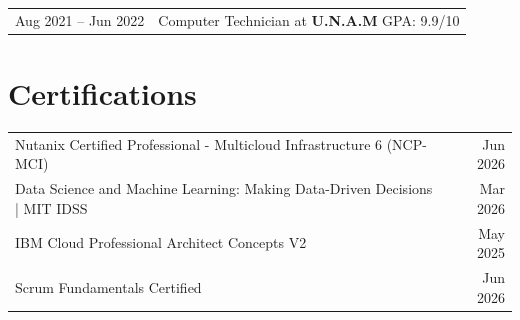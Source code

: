 \documentclass[a4paper,11pt]{article}
\begin{document}
\begin{tabularx}{\linewidth}{@{}l X@{}}	
Aug 2021 -- Jun 2022 & Computer Technician at \textbf{U.N.A.M} \hfill GPA: 9.9/10  
\end{tabularx}


\section{Certifications}

\begin{tabularx}{\linewidth}{@{}X r@{}}
Nutanix Certified Professional - Multicloud Infrastructure 6 (NCP-MCI) & Jun 2026 \\
Data Science and Machine Learning: Making Data-Driven Decisions | MIT IDSS & Mar 2026 \\
IBM Cloud Professional Architect Concepts V2 & May 2025 \\
Scrum Fundamentals Certified & Jun 2026 \\
\end{tabularx}







\end{document}
